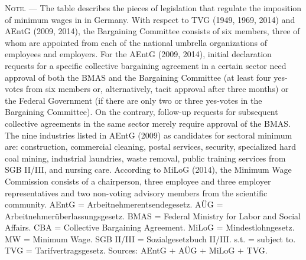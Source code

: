 \documentclass[11pt,oneside,reqno,xcolor=dvipsnames]{article} %
\begin{document}
\begin{appendix}
\begin{refsection}
\begin{landscape}
\begin{table}[!ht]
{\begin{threeparttable}
\begin{tablenotes}
\item  \footnotesize \textsc{Note. ---} The table describes the pieces of legislation that regulate the imposition of minimum wages in in Germany. With respect to TVG (1949, 1969, 2014) and AEntG (2009, 2014), the Bargaining Committee consists of six members, three of whom are appointed from each of the national umbrella organizations of employees and employers. For the AEntG (2009, 2014), initial declaration requests for a specific collective bargaining agreement in a certain sector need approval of both the BMAS and the Bargaining Committee (at least four yes-votes from six members or, alternatively, tacit approval after three months) or the Federal Government (if there are only two or three yes-votes in the Bargaining Committee). On the contrary, follow-up requests for subsequent collective agreements in the same sector merely require approval of the BMAS. The nine industries listed in AEntG (2009) as candidates for sectoral minimum are: construction, commercial cleaning, postal services, security, specialized hard coal mining, industrial laundries, waste removal, public training services from SGB II/III, and nursing care. According to MiLoG (2014), the Minimum Wage Commission consists of a chairperson, three employee and three employer representatives and two non-voting advisory members from the scientific community. AEntG = Arbeitnehmerentsendegesetz. AÜG = Arbeitnehmerüberlassungsgesetz. BMAS = Federal Ministry for Labor and Social Affairs. CBA = Collective Bargaining Agreement. MiLoG = Mindestlohngesetz. MW = Minimum Wage. SGB II/III = Sozialgesetzbuch II/III. s.t. = subject to. TVG = Tarifvertragsgesetz. Sources: AEntG $\plus$ AÜG $\plus$ MiLoG $\plus$ TVG.
\end{tablenotes}


\end{threeparttable}
}
\end{table}



\clearpage



\begin{table}[!ht]

\centering

\renewcommand{\arraystretch}{1.5}
\end{table}
\end{landscape}
\end{refsection}
\end{appendix}
\end{document}
